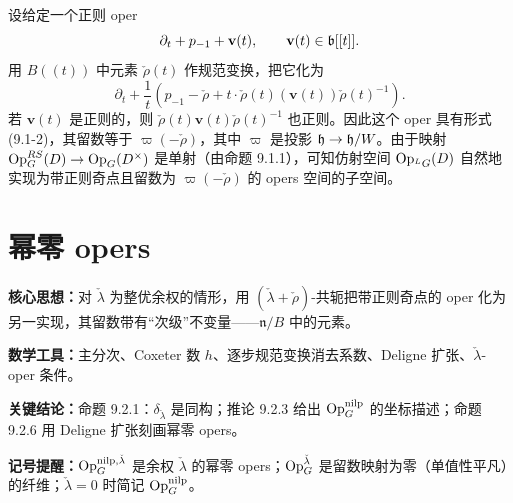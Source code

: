 设给定一个正则 oper
\[
\partial_t + p_{-1} + \mathbf{v}(t),\qquad \mathbf{v}(t)\in\mathfrak{b}[[t]].
\]
用 $B((t))$ 中元素 $\check\rho(t)$ 作规范变换，把它化为
\[
\partial_t + \frac{1}{t}\left(p_{-1}-\check\rho + t\cdot\check\rho(t)(\mathbf{v}(t))\check\rho(t)^{-1}\right).
\]
若 $\mathbf{v}(t)$ 是正则的，则 $\check\rho(t)\mathbf{v}(t)\check\rho(t)^{-1}$ 也正则。因此这个 oper 具有形式 (9.1-2)，其留数等于 $\varpi(-\check\rho)$，其中 $\varpi$ 是投影 $\mathfrak{h}\to\mathfrak{h}/W$。由于映射 $\operatorname{Op}^{RS}_G(D)\to\operatorname{Op}_G(D^\times)$ 是单射（由命题 9.1.1），可知仿射空间 $\operatorname{Op}_{{}^L G}(D)$ 自然地实现为带正则奇点且留数为 $\varpi(-\check\rho)$ 的 opers 空间的子空间。


\section{幂零 opers}

\begin{keypoints}
    \item \textbf{核心思想：}对 $\check\lambda$ 为整优余权的情形，用 $(\check\lambda+\check\rho)$-共轭把带正则奇点的 oper 化为另一实现，其留数带有“次级”不变量——$\mathfrak{n}/B$ 中的元素。
    \item \textbf{数学工具：}主分次、Coxeter 数 $h$、逐步规范变换消去系数、Deligne 扩张、$\check\lambda$-oper 条件。
    \item \textbf{关键结论：}命题 9.2.1：$\delta_{\check\lambda}$ 是同构；推论 9.2.3 给出 $\operatorname{Op}^{\mathrm{nilp}}_G$ 的坐标描述；命题 9.2.6 用 Deligne 扩张刻画幂零 opers。
    \item \textbf{记号提醒：}$\operatorname{Op}^{\mathrm{nilp},\check\lambda}_G$ 是余权 $\check\lambda$ 的幂零 opers；$\operatorname{Op}^{\check\lambda}_G$ 是留数映射为零（单值性平凡）的纤维；$\check\lambda=0$ 时简记 $\operatorname{Op}^{\mathrm{nilp}}_G$。
\end{keypoints}

